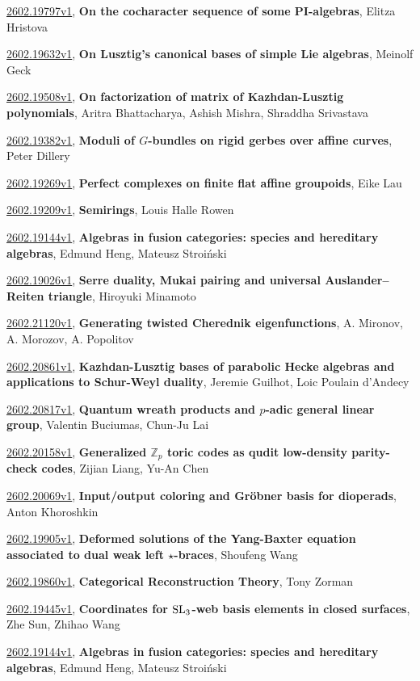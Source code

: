 \documentclass[9pt, a4paper]{article}
\theoremstyle{plain}
\theoremstyle{definition}
\theoremstyle{remark}
\newcommand{\arxiv}[3]{\href{https://arxiv.org/abs/#1}{#1}, \textbf{\textcolor{arxivblue}{#2}}, #3}
\begin{document}
\arxiv{2602.19797v1}{On the cocharacter sequence of some PI-algebras}{Elitza Hristova}

\arxiv{2602.19632v1}{On Lusztig's canonical bases of simple Lie algebras}{Meinolf Geck}

\arxiv{2602.19508v1}{On factorization of matrix of Kazhdan-Lusztig polynomials}{Aritra Bhattacharya, Ashish Mishra, Shraddha Srivastava}

\arxiv{2602.19382v1}{Moduli of $G$-bundles on rigid gerbes over affine curves}{Peter Dillery}

\arxiv{2602.19269v1}{Perfect complexes on finite flat affine groupoids}{Eike Lau}

\arxiv{2602.19209v1}{Semirings}{Louis Halle Rowen}

\arxiv{2602.19144v1}{Algebras in fusion categories: species and hereditary algebras}{Edmund Heng, Mateusz Stroiński}

\arxiv{2602.19026v1}{Serre duality, Mukai pairing and universal Auslander--Reiten triangle}{Hiroyuki Minamoto}

\arxiv{2602.21120v1}{Generating twisted Cherednik eigenfunctions}{A. Mironov, A. Morozov, A. Popolitov}

\arxiv{2602.20861v1}{Kazhdan-Lusztig bases of parabolic Hecke algebras and applications to Schur-Weyl duality}{Jeremie Guilhot, Loic Poulain d'Andecy}

\arxiv{2602.20817v1}{Quantum wreath products and $p$-adic general linear group}{Valentin Buciumas, Chun-Ju Lai}

\arxiv{2602.20158v1}{Generalized $\mathbb{Z}_p$ toric codes as qudit low-density parity-check codes}{Zijian Liang, Yu-An Chen}

\arxiv{2602.20069v1}{Input/output coloring and Gröbner basis for dioperads}{Anton Khoroshkin}

\arxiv{2602.19905v1}{Deformed solutions of the Yang-Baxter equation associated to dual weak left $\star$-braces}{Shoufeng Wang}

\arxiv{2602.19860v1}{Categorical Reconstruction Theory}{Tony Zorman}

\arxiv{2602.19445v1}{Coordinates for ${\rm SL}_3$-web basis elements in closed surfaces}{Zhe Sun, Zhihao Wang}

\arxiv{2602.19144v1}{Algebras in fusion categories: species and hereditary algebras}{Edmund Heng, Mateusz Stroiński}

\end{document}
